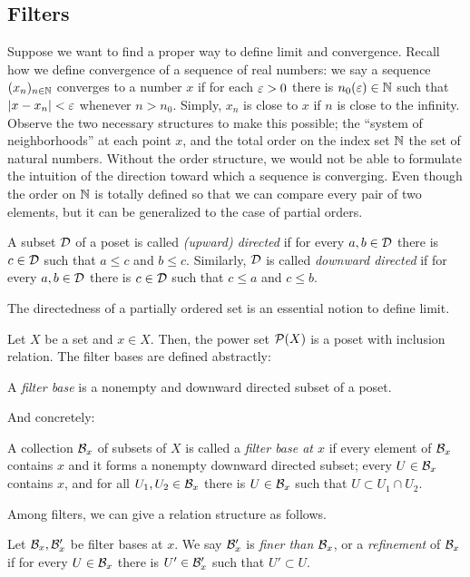 \documentclass{../crs}
\begin{document}
\subsection{Filters}
Suppose we want to find a proper way to define limit and convergence.
Recall how we define convergence of a sequence of real numbers: we say a sequence $(x_n)_{n\in\mathbb{N}}$ converges to a number $x$ if for each $\varepsilon>0$ there is $n_0(\varepsilon)\in\mathbb{N}$ such that $|x-x_n|<\varepsilon$ whenever $n>n_0$.
Simply, $x_n$ is close to $x$ if $n$ is close to the infinity.
Observe the two necessary structures to make this possible; the ``system of neighborhoods'' at each point $x$, and the total order on the index set $\mathbb{N}$ the set of natural numbers.
Without the order structure, we would not be able to formulate the intuition of the direction toward which a sequence is converging.
Even though the order on $\mathbb{N}$ is totally defined so that we can compare every pair of two elements, but it can be generalized to the case of partial orders.
\begin{defn}
A subset $\mathcal{D}$ of a poset is called \emph{(upward) directed} if for every $a,b\in\mathcal{D}$ there is $c\in\mathcal{D}$ such that $a\le c$ and $b\le c$.
Similarly, $\mathcal{D}$ is called \emph{downward directed} if for every $a,b\in\mathcal{D}$ there is $c\in\mathcal{D}$ such that $c\le a$ and $c\le b$.
\end{defn}

The directedness of a partially ordered set is an essential notion to define limit.

Let $X$ be a set and $x\in X$.
Then, the power set $\mathcal{P}(X)$ is a poset with inclusion relation.
The filter bases are defined abstractly:
\begin{defn}
A \emph{filter base} is a nonempty and downward directed subset of a poset.
\end{defn}
And concretely:
\begin{defn}
A collection $\mathcal{B}_x$ of subsets of $X$ is called a \emph{filter base at $x$} if every element of $\mathcal{B}_x$ contains $x$ and it forms a nonempty downward directed subset; every $U\in\mathcal{B}_x$ contains $x$, and for all $U_1,U_2\in\mathcal{B}_x$ there is $U\in\mathcal{B}_x$ such that $U\subset U_1\cap U_2$.
\end{defn}

Among filters, we can give a relation structure as follows.

\begin{defn}
Let $\mathcal{B}_x,\mathcal{B}'_x$ be filter bases at $x$.
We say $\mathcal{B}'_x$ is \emph{finer than} $\mathcal{B}_x$, or a \emph{refinement} of $\mathcal{B}_x$ if for every $U\in\mathcal{B}_x$ there is $U'\in\mathcal{B}'_x$ such that $U'\subset U$.
\end{defn}
\end{document}

